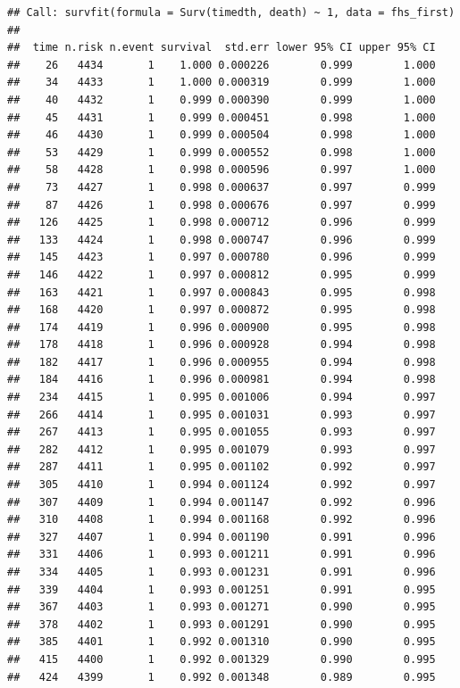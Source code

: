 \documentclass[
]{book}
\begin{document}
\begin{verbatim}
## Call: survfit(formula = Surv(timedth, death) ~ 1, data = fhs_first)
## 
##  time n.risk n.event survival  std.err lower 95% CI upper 95% CI
##    26   4434       1    1.000 0.000226        0.999        1.000
##    34   4433       1    1.000 0.000319        0.999        1.000
##    40   4432       1    0.999 0.000390        0.999        1.000
##    45   4431       1    0.999 0.000451        0.998        1.000
##    46   4430       1    0.999 0.000504        0.998        1.000
##    53   4429       1    0.999 0.000552        0.998        1.000
##    58   4428       1    0.998 0.000596        0.997        1.000
##    73   4427       1    0.998 0.000637        0.997        0.999
##    87   4426       1    0.998 0.000676        0.997        0.999
##   126   4425       1    0.998 0.000712        0.996        0.999
##   133   4424       1    0.998 0.000747        0.996        0.999
##   145   4423       1    0.997 0.000780        0.996        0.999
##   146   4422       1    0.997 0.000812        0.995        0.999
##   163   4421       1    0.997 0.000843        0.995        0.998
##   168   4420       1    0.997 0.000872        0.995        0.998
##   174   4419       1    0.996 0.000900        0.995        0.998
##   178   4418       1    0.996 0.000928        0.994        0.998
##   182   4417       1    0.996 0.000955        0.994        0.998
##   184   4416       1    0.996 0.000981        0.994        0.998
##   234   4415       1    0.995 0.001006        0.994        0.997
##   266   4414       1    0.995 0.001031        0.993        0.997
##   267   4413       1    0.995 0.001055        0.993        0.997
##   282   4412       1    0.995 0.001079        0.993        0.997
##   287   4411       1    0.995 0.001102        0.992        0.997
##   305   4410       1    0.994 0.001124        0.992        0.997
##   307   4409       1    0.994 0.001147        0.992        0.996
##   310   4408       1    0.994 0.001168        0.992        0.996
##   327   4407       1    0.994 0.001190        0.991        0.996
##   331   4406       1    0.993 0.001211        0.991        0.996
##   334   4405       1    0.993 0.001231        0.991        0.996
##   339   4404       1    0.993 0.001251        0.991        0.995
##   367   4403       1    0.993 0.001271        0.990        0.995
##   378   4402       1    0.993 0.001291        0.990        0.995
##   385   4401       1    0.992 0.001310        0.990        0.995
##   415   4400       1    0.992 0.001329        0.990        0.995
##   424   4399       1    0.992 0.001348        0.989        0.995

\end{verbatim}
\end{document}
